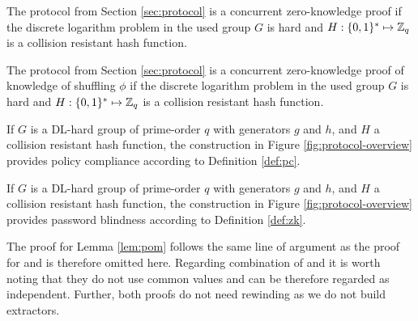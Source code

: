 \begin{lemma}\label{lem:pom}
  The \PoM protocol from Section \ref{sec:protocol} is a concurrent zero-knowledge proof if the discrete logarithm problem in the used group $G$ is hard and $H:\{0,1\}^\ast\mapsto\mathbb{Z}_q$ is a collision resistant hash function.
\end{lemma}

\begin{lemma}\label{lem:pos}
  The \PoS protocol from Section \ref{sec:protocol} is a concurrent zero-knowledge proof of knowledge of shuffling $\phi$ if the discrete logarithm problem in the used group $G$ is hard and $H:\{0,1\}^\ast\mapsto\mathbb{Z}_q$ is a collision resistant hash function.
\end{lemma}


\begin{theorem}\label{theo:pc}
  If $G$ is a DL-hard group of prime-order $q$ with generators $g$ and $h$, and $H$ a collision resistant hash function, the construction in Figure \ref{fig:protocol-overview} provides policy compliance according to Definition \ref{def:pc}.
\end{theorem}

%
\begin{theorem}\label{theo:zk}
  If $G$ is a DL-hard group of prime-order $q$ with generators $g$ and $h$, and $H$ a collision resistant hash function, the construction in Figure \ref{fig:protocol-overview} provides password blindness according to Definition \ref{def:zk}.
\end{theorem}


The proof for Lemma \ref{lem:pom} follows the same line of argument as the proof for \PoC and is therefore omitted here.
Regarding combination of \PoC and \PoM it is worth noting that they do not use common values and can be therefore regarded as independent.
Further, both proofs do not need rewinding as we do not build extractors.


